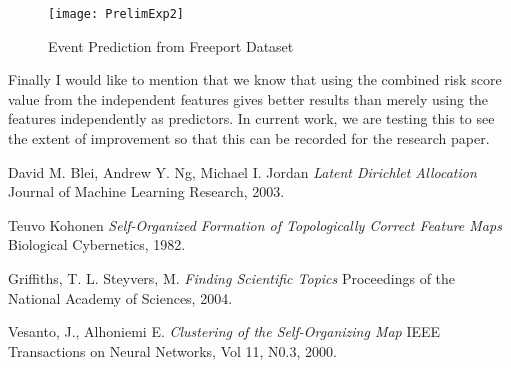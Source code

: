 \documentclass{article}
\begin{document}
\begin{figure}[h]
	
	\centering 
	\texttt{[image: PrelimExp2]}
	\caption{Event Prediction from Freeport Dataset}\label{Ex-Fig3}
	
\end{figure}

Finally I would like to mention that we know that using the combined risk score value from the independent features gives better results than merely using the features independently as predictors. In current work, we are testing this to see the extent of improvement so that this can be recorded for the research paper.

   
\begin{thebibliography}{1}
  David M. Blei, Andrew Y. Ng, Michael I. Jordan {\em Latent Dirichlet Allocation} Journal of Machine Learning Research, 2003.
 
  Teuvo Kohonen {\em Self-Organized Formation of Topologically Correct Feature Maps} Biological Cybernetics, 1982.
 
  Griffiths, T. L. Steyvers, M. {\em Finding Scientific Topics} Proceedings of the National Academy of Sciences, 2004.
 
  Vesanto, J., Alhoniemi E. {\em Clustering of the Self-Organizing Map} IEEE Transactions on Neural Networks, Vol 11, N0.3, 2000.
\end{thebibliography}
\end{document}

